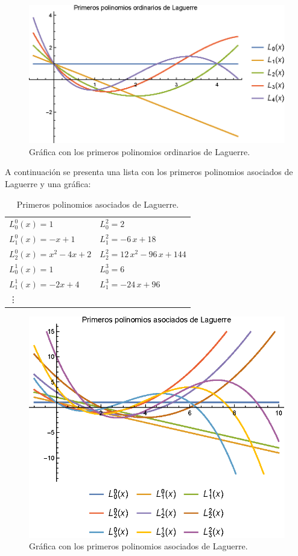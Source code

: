 \begin{figure}[H]
    \centering
    \includegraphics[scale=1.3]{Imagenes/Polinomios_Laguerre_01.eps}
    \caption{Gráfica con los primeros polinomios ordinarios de Laguerre.}
    \label{fig:grafica_Laguerre_01}
\end{figure}

A continuación se presenta una lista con los primeros polinomios asociados de Laguerre y una gráfica:
\begin{table}[H]
\centering
\large
\begin{tabular}{l l}
$L_{0}^{0} (x) = 1$ & $L_{0}^{2} = 2$  \\
$L_{1}^{0} (x) = - x + 1$ & $L_{1}^{2} = -6 \, x + 18$ \\
$L_{2}^{0} (x) = x^{2} - 4 x + 2$ & $L_{2}^{2} = 12 \, x^{2} - 96 \, x + 144$ \\
$L_{0}^{1} (x) = 1$ & $L_{0}^{3} = 6$ \\
$L_{1}^{1} (x) = -2x + 4$ & $L_{1}^{3} = -24 \, x + 96$ \\
\vdots 
\end{tabular}
\caption{Primeros polinomios asociados de Laguerre.}
\label{table:tabla_02}
\end{table}
\begin{figure}[H]
    \centering
    \includegraphics[scale=1.3]{Imagenes/Polinomios_Laguerre_02.eps}
    \caption{Gráfica con los primeros polinomios asociados de Laguerre.}
    \label{fig:grafica_Laguerre_02}
\end{figure}

